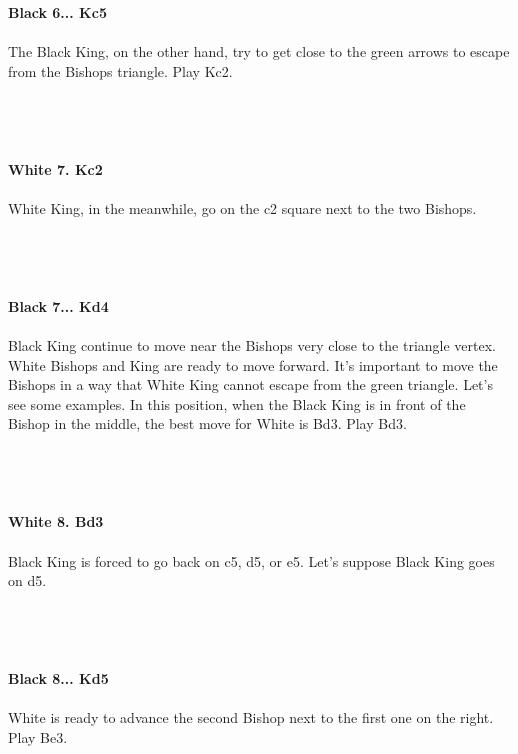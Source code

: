 \documentclass{article}
\begin{document}
\textbf{Black 6... Kc5}\\
\\
The Black King, on the other hand, try to get close to the green arrows to escape from the Bishops triangle. Play Kc2.\\\\
\\

\\
\\
\textbf{White 7. Kc2}\\
\\
White King, in the meanwhile, go on the c2 square next to the two Bishops.\\\\
\\

\\
\\
\textbf{Black 7... Kd4}\\
\\
Black King continue to move near the Bishops very close to the triangle vertex. White Bishops and King are ready to move forward. It's important to move the Bishops in a way that White King cannot escape from the green triangle. Let's see some examples. In this position, when the Black King is in front of the Bishop in the middle, the best move for White is Bd3. Play Bd3.\\\\
\\

\\
\\
\textbf{White 8. Bd3}\\
\\
Black King is forced to go back on c5, d5, or e5. Let's suppose Black King goes on d5.\\\\
\\

\\
\\
\textbf{Black 8... Kd5}\\
\\
White is ready to advance the second Bishop next to the first one on the right. Play Be3.\\\\
\\
\end{document}
